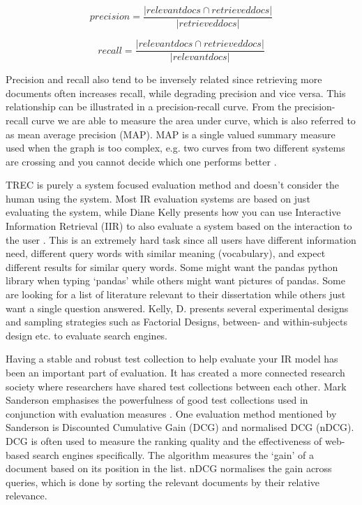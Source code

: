 $$ precision = \frac{|{relevant docs} \cap {retrieved docs}|}{|{retrieved docs}|} $$

$$ recall = \frac{|{relevant docs} \cap {retrieved docs}|}{|{relevant docs}|} $$

Precision and recall also tend to be inversely related since retrieving more documents often increases recall, while degrading precision and vice versa\cite{voorhees:evaluation}. This relationship can be illustrated in a precision-recall curve. From the precision-recall curve we are able to measure the area under curve, which is also referred to as mean average precision (MAP). MAP is a single valued summary measure used when the graph is too complex, e.g. two curves from two different systems are crossing and you cannot decide which one performs better \cite{voorhees:evaluation}.

TREC is purely a system focused evaluation method and doesn’t consider the human using the system. Most IR evaluation systems are based on just evaluating the system, while Diane Kelly presents how you can use Interactive Information Retrieval (IIR) to also evaluate a system based on the interaction to the user \cite{kelly:evaluation}. This is an extremely hard task since all users have different information need, different query words with similar meaning (vocabulary), and expect different results for similar query words. Some might want the pandas python library when typing ‘pandas’ while others might want pictures of pandas. Some are looking for a list of literature relevant to their dissertation while others just want a single question answered. Kelly, D. presents several experimental designs and sampling strategies such as Factorial Designs, between- and within-subjects design etc. to evaluate search engines.

Having a stable and robust test collection to help evaluate your IR model has been an important part of evaluation. It has created a more connected research society where researchers have shared test collections between each other. Mark Sanderson emphasises the powerfulness of good test collections used in conjunction with evaluation measures \cite{sanderson:evaluation}. One evaluation method mentioned by Sanderson is Discounted Cumulative Gain (DCG) and normalised DCG (nDCG)\cite{sanderson:evaluation}. DCG is often used to measure the ranking quality and the effectiveness of web-based search engines specifically. The algorithm measures the ‘gain’ of a document based on its position in the list. nDCG normalises the gain across queries, which is done by sorting the relevant documents by their relative relevance.

